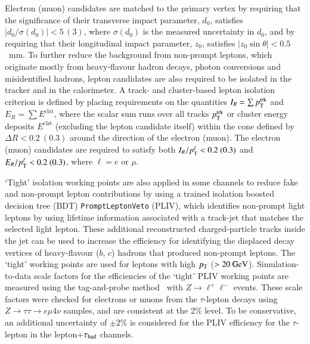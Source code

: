 Electron (muon) candidates are matched to the primary vertex by requiring that the significance of their transverse impact parameter, $d_0$, 
satisfies $|d_0/\sigma(d_0)|<5\,(3)$, where $\sigma(d_0)$ is the measured uncertainty in $d_0$,
and by requiring that their longitudinal impact parameter, $z_0$, satisfies $|z_0 \sin\theta|<0.5$~mm.
To further reduce the background from non-prompt leptons, which originate mostly from heavy-flavour hadron decays, photon conversions and misidentified hadrons,
lepton candidates are also required to be isolated in the tracker and in the calorimeter.
A track- and cluster-based lepton isolation criterion is defined by placing requirements on the quantities $I_R = \sum p_{\text{T}}^{\textrm{trk}}$ and $E_R = \sum E^{\textrm{clst}}$, where
the scalar sum runs over all tracks $p_{\text{T}}^{\textrm{trk}}$ or cluster energy deposits $E^{\textrm{clst}}$ (excluding the lepton candidate itself)
within the cone defined by $\Delta R<0.2~(0.3)$ around the %
direction of the electron (muon). The electron (muon) candidates are required to satisfy both
$I_R/p_{\text{T}}^\ell < 0.2~(0.3)$ and $E_R/p_{\text{T}}^\ell < 0.2~(0.3)$, where $\ell=e$ or $\mu$.

`Tight' isolation working points are also applied in some channels to reduce fake and non-prompt lepton contributions by using a trained isolation boosted decision tree (BDT)
\texttt{PromptLeptonVeto} (PLIV), which identifies non-prompt light leptons by using lifetime information associated with a track-jet that matches the selected light lepton.
These additional reconstructed charged-particle tracks inside the jet can be
used to increase the efficiency for identifying the displaced decay vertices of heavy-flavour ($b$, $c$) hadrons that produced non-prompt leptons.
The `tight' working points are used for leptons with high $p_{\text{T}}$ ($>20~\text{GeV}$).
Simulation-to-data scale factors for the efficiencies of the `tight' PLIV working points are measured using the tag-and-probe method~\cite{PERF-2017-01}
with $Z\rightarrow \ell^+\ell^-$ events. These scale factors were checked for electrons or muons from the $\tau$-lepton decays
using $Z\rightarrow\tau\tau\rightarrow e\mu4\nu$ samples, and are consistent at the 2\% level. To be conservative, an
additional uncertainty of $\pm 2\%$ is considered for the PLIV efficiency for the $\tau$-lepton in the lepton+$\tau_\text{had}$ channels.

